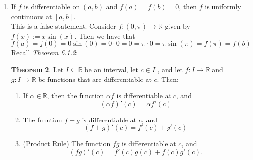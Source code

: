\documentclass[12pt,letterpaper]{article}
\newcommand{\R}{\mathbb{R}}
\theoremstyle{case}
\theoremstyle{definition}
\newtheorem*{theorem*}{Theorem}
\begin{document}
\begin{enumerate}
\begin{enumerate}
\begin{proof}
				Recall the \textit{Uniform Continuity Theorem}:
				\begin{theorem*}[\textbf{Uniform Continuity Theorem}]
					Let $I$ be a closed bounded interval and let $f:I \rightarrow \R$ be continuous on $I$. Then $f$ is uniformly continuous on $I$.
				\end{theorem*}
				Since $[a,b]$ is a closed interval, and since $f$ is continuous on $[a,b]$, we have that by the \textit{Uniform Continuity Theorem}, $f$ is uniformly continuous on $[a,b]$.\\
				
				$\therefore$ If $f$ is differentiable on $[a,b]$, then $f$ is uniformly continuous on $[a,b]$.\\
			\end{proof}
			\item If $f$ is differentiable on $(a,b)$ and $f(a)=f(b)=0$, then $f$ is uniformly continuous at $[a,b]$.\\
			
			This is a false statement. Consider $f:(0,\pi) \to \R$ given by $f(x):=x\sin (x)$. Then we have that
			\[f(a)=f(0)=0 \sin (0) = 0 \cdot 0 = 0 = \pi \cdot 0 = \pi \sin (\pi) = f(\pi)=f(b)\]
			Recall \textit{Theorem 6.1.2}:
			\begin{theorem*}
				Let $I \subseteq \R$ be an interval, let $c \in I$ , and let $f:I \rightarrow \R$ and $g:I \rightarrow \R$ be functions that are differentiable at $c$. Then:
				\begin{enumerate}
					\item If $\alpha \in \R$, then the function $\alpha f$ is differentiable at $c$, and \[(\alpha f)'(c) = \alpha f'(c)\]
					
					\item The function $f+g$ is differentiable at $c$, and 
					\[(f+g)'(c) = f'(c)+g'(c)\]
					
					\item (Product Rule) The function $fg$ is differentiable at $c$, and
					\[(fg)'(c) = f'(c)g(c) + f(c)g'(c).\]
					

\end{enumerate}
\end{theorem*}
\end{enumerate}
\end{enumerate}
\end{document}
